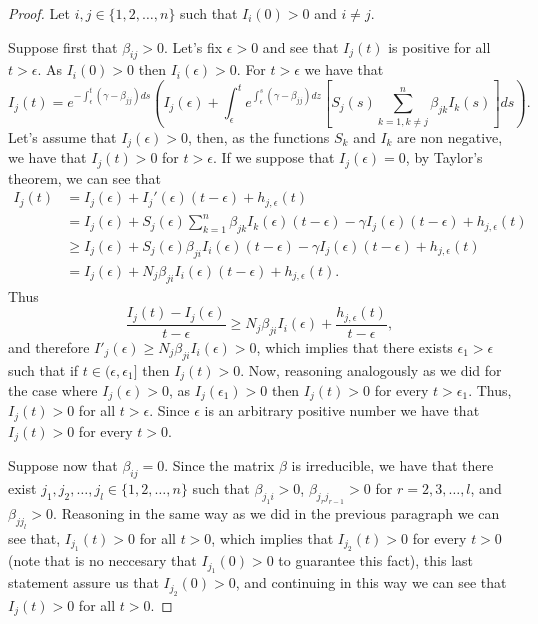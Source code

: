\documentclass[a4paper,10pt]{article}
\theoremstyle{remark}
\begin{document}
\begin{proof} Let $i,j\in \{1,2,\ldots,n\}$ such that $I_i(0)>0$ and $i \neq j$. 

Suppose first that $\beta_{ij}>0$. 
Let's fix $\epsilon>0$ and see that $I_j(t)$ is positive for all  $t>\epsilon$. As $I_i(0)>0$ then $I_i(\epsilon)>0$. For $t>\epsilon$ we have that
\begin{equation*}
I_j(t)=e^{-\int_{\epsilon}^{t}(\gamma-\beta_{jj}) ds}\left(I_j(\epsilon)+\int_{\epsilon}^{t}e^{\int_{\epsilon}^{s}(\gamma-\beta_{jj}) dz}\left[S_j(s)\sum_{k=1,k\neq j}^{n}\beta_{jk}I_k(s)\right]ds\right).
\end{equation*}
Let's assume that $I_j(\epsilon)>0$, then, as the functions $S_k$ and $I_k$ are non negative, we have that $I_j(t)>0$ for $t>\epsilon$. If  we suppose that $I_j(\epsilon)=0$,
by Taylor's theorem, we can see that
\begin{equation*}
\begin{split}
I_j(t)&=I_j(\epsilon)+I_j'(\epsilon)(t-\epsilon)+h_{j,\epsilon}(t)\\
&=I_j(\epsilon)+S_j(\epsilon)\sum_{k=1}^{n}\beta_{jk}I_k(\epsilon)(t-\epsilon)-\gamma I_j(\epsilon)(t-\epsilon)+h_{j,\epsilon}(t)\\
&\geq I_j(\epsilon)+S_j(\epsilon)\beta_{ji}I_i(\epsilon)(t-\epsilon)-\gamma I_j(\epsilon)(t-\epsilon)+h_{j,\epsilon}(t)\\
&=I_j(\epsilon)+N_j\beta_{ji}I_i(\epsilon)(t-\epsilon)+h_{j,\epsilon}(t).
\end{split}
\end{equation*}
Thus
\begin{equation*}
\frac{I_j(t)-I_j(\epsilon)}{t-\epsilon}\geq N_j\beta_{ji}I_i(\epsilon)+\frac{h_{j,\epsilon}(t)}{t-\epsilon},
\end{equation*}
and therefore $I'_j(\epsilon)\geq N_j\beta_{ji}I_i(\epsilon)>0$, which implies that there exists $\epsilon_1>\epsilon$  such that if $t\in (\epsilon,\epsilon_1]$ then $I_j(t)>0$. Now,  reasoning analogously as we did for the case where $I_j(\epsilon)>0$, as  $I_j\left(\epsilon_1\right)>0$ then $I_j(t)>0$ for every $t>\epsilon_1$. Thus, $I_j(t)>0$ for all $t>\epsilon$. Since $\epsilon$ is an arbitrary positive number we have that $I_j(t)>0$ for every $t>0$.

Suppose now that $\beta_{ij}=0$. 
Since the matrix $\beta$ is irreducible, we have that there exist $j_1,j_2,\ldots,j_l \in \{1,2,\ldots,n\}$ such that $\beta_{{j_{1} i}}>0$, $\beta_{j_{r}j_{r-1}}>0$ for $r=2,3,\ldots,l$, and $\beta_{jj_{l}}>0$. Reasoning in the same way as we did in the previous paragraph we can see that, $I_{j_1}(t)>0$ for all $t>0$, which implies that $I_{j_2}(t)>0$ for every $t>0$ (note that is no neccesary that $I_{j_1}(0)>0$ to guarantee this fact), this last statement assure us that $I_{j_2}(0)>0$, and continuing in this way we can see that $I_j(t)>0$ for all $t>0$.



\end{proof}
\end{document}
